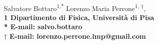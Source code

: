 \documentclass[10pt,letterpaper]{article}
\date{15.03.16}
\begin{document}
\vspace*{0.30in}

\begin{flushleft}
{\Large
\textbf{}
}
\newline
\\
Salvatore Bottaro\textsuperscript{1,*}
Lorenzo Maria Perrone\textsuperscript{1, $\dagger$},
\\
\bf{1} Dipartimento di Fisica, Università di Pisa
\\

% 
%




* E-mail: salvo.bottaro\\
$\dagger$ E-mail: lorenzo.perrone.lmp@gmail.com
\end{flushleft}
\end{document}
